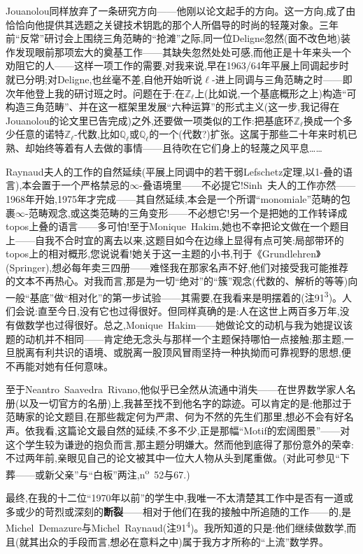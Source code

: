 Jouanolou同样放弃了一条研究方向——他刚以论文起手的方向。这一方向,成了由恰恰向他提供其选题之关键技术钥匙的那个人所倡导的时尚的轻蔑对象。三年前“反常”研讨会上围绕三角范畴的“抢滩”之际,同一位Deligne忽然(面不改色地)装作发现眼前那项宏大的奠基工作——其缺失忽然处处可感,而他正是十年来头一个劝阻它的人\dmark{}——这样一项工作的需要,对我来说,早在1963/64年平展上同调起步时就已分明;对Deligne,也丝毫不差,自他开始听说$\ell$-进上同调与三角范畴之时——即次年他登上我的研讨班之时。问题在于:在$\mathbb{Z}_\ell$上(比如说,一个基底概形之上)构造“可构造三角范畴”、并在这一框架里发展“六种运算”的形式主义(这一步,我记得在Jouanolou的论文里已告完成)之外,还要做一项类似的工作:把基底环$\mathbb{Z}_\ell$换成一个多少任意的诺特$\mathbb{Z}_\ell$-代数,比如$\mathbb{Q}_\ell$或$\mathbb{Q}_\ell$的一个(代数?)扩张。这属于那些二十年来时机已熟、却始终等着有人去做的事情——且待吹在它们身上的轻蔑之风平息……

Raynaud夫人的工作的自然延续(平展上同调中的若干弱Lefschetz定理,以1-叠的语言),本会置于一个严格禁忌的$\infty$-叠语境里——不必提它!Sinh~夫人的工作亦然——1968年开始,1975年才完成——其自然延续,本会是一个所谓“monomiale”范畴的包裹$\infty$-范畴观念,或这类范畴的三角变形——不必想它!另一个是把她的工作转译成topos上叠的语言——多可怕!至于Monique~Hakim,她也不幸把论文做在一个题目上——自我不合时宜的离去以来,这题目如今在边缘上显得有点可笑:局部带环的topos上的相对概形,您说说看!她关于这一主题的小书,刊于《Grundlehren》(Springer),想必每年卖三四册——难怪我在那家名声不好,他们对接受我可能推荐的文本不再热心。对我而言,那是为一切“绝对”的“簇”观念(代数的、解析的等等)向一般“基底”做“相对化”的第一步试验——其需要,在我看来是明摆着的(注91\textsuperscript{3})。人们会说:直至今日,没有它也过得很好。但同样真确的是:人在这世上两百多万年,没有做数学也过得很好。总之,Monique~Hakim——她做论文的动机与我为她提议该题的动机并不相同——肯定绝无念头与那样一个主题保持哪怕一点接触;那主题,一旦脱离有利共识的语境、或脱离一股顶风冒雨坚持一种执拗而可靠视野的思想,便不再能对她有任何意味。

至于Neantro~Saavedra~Rivano,他似乎已全然从流通中消失——在世界数学家人名册(以及一切官方的名册)上,我甚至找不到他名字的踪迹。可以肯定的是:他那过于范畴家的论文题目,在那些裁定何为严肃、何为不然的先生们那里,想必不会有好名声。依我看,这篇论文最自然的延续,不多不少,正是那幅“Motif的宏阔图景”——对这个学生较为谦逊的抱负而言,那主题分明嫌大。然而他到底得了那份意外的荣幸:不过两年前,亲眼见自己的论文被其中一位大人物从头到尾重做。(对此可参见“下葬——或新父亲”与“白板”两注,n\textsuperscript{o}~52与67.)

最终,在我的十二位“1970年以前”的学生中,我唯一不太清楚其工作中是否有一道或多或少的苛烈或深刻的\textbf{断裂}——相对于他们在我的接触中所追随的工作——的,是Michel~Demazure与Michel~Raynaud(注91\textsuperscript{4})。我所知道的只是:他们继续做数学,而且(就其出众的手段而言,想必在意料之中)属于我方才所称的“上流”数学界。

